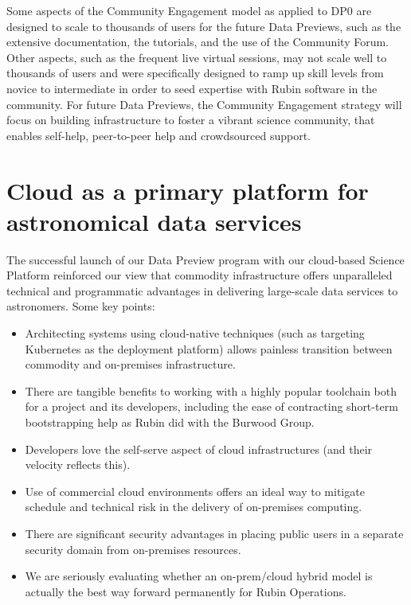 \documentclass[11pt,twoside]{article}
\begin{document}
Some aspects of the Community Engagement model as applied to DP0 are designed to scale to thousands of users for the future Data Previews, such as the extensive documentation, the tutorials, and the use of the Community Forum.
Other aspects, such as the frequent live virtual sessions, may not scale well to thousands of users and were specifically designed to ramp up skill levels from novice to intermediate in order to seed expertise with Rubin software in the community.
For future Data Previews, the Community Engagement strategy will focus on building infrastructure to foster a vibrant science community, that enables self-help, peer-to-peer help and crowdsourced support.

\section{Cloud as a primary platform for astronomical data services}

The successful launch of our Data Preview program with our cloud-based Science Platform reinforced our view that commodity infrastructure offers unparalleled technical and programmatic advantages in delivering large-scale data services to astronomers. Some key points:

\begin{itemize}

    \item Architecting systems using cloud-native techniques (such as targeting Kubernetes as the deployment platform) allows painless transition between commodity and on-premises infrastructure.
    \item There are tangible benefits to working with a highly popular toolchain both for a project and its developers, including the ease of contracting short-term bootstrapping help as Rubin did with the Burwood Group.
    \item Developers love the self-serve aspect of cloud infrastructures (and their velocity reflects this).
    \item Use of commercial cloud environments offers an ideal way to mitigate schedule and technical risk in the delivery of on-premises computing.
    \item There are significant security advantages in placing public users in a separate security domain from on-premises resources.
    \item We are seriously evaluating whether an on-prem/cloud hybrid model is actually the best way forward permanently for Rubin Operations.
\end{itemize}
\end{document}
